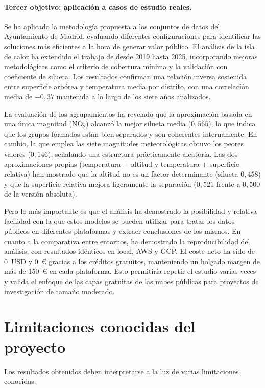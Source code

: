 \paragraph{Tercer objetivo: aplicación a casos de estudio reales.}
Se ha aplicado la metodología propuesta a los conjuntos de datos del Ayuntamiento de Madrid, evaluando diferentes configuraciones para identificar las soluciones más eficientes a la hora de generar valor público. El análisis de la isla de calor ha extendido el trabajo de \citep{Meneses2023Madrid} desde 2019 hasta 2025, incorporando mejoras metodológicas como el criterio de cobertura mínima y la validación con coeficiente de silueta. Los resultados confirman una relación inversa sostenida entre superficie arbórea y temperatura media por distrito, con una correlación media de $-0,37$ mantenida a lo largo de los siete años analizados.

La evaluación de los agrupamientos ha revelado que la aproximación basada en una única magnitud (NO$_2$) alcanzó la mejor silueta media ($0,565$), lo que indica que los grupos formados están bien separados y son coherentes internamente. En cambio, la que emplea las siete magnitudes meteorológicas obtuvo los peores valores ($0,146$), señalando una estructura prácticamente aleatoria. Las dos aproximaciones propias (temperatura + altitud y temperatura + superficie relativa) han mostrado que la altitud no es un factor determinante (silueta $0,458$) y que la superficie relativa mejora ligeramente la separación ($0,521$ frente a $0,500$ de la versión absoluta).

Pero lo más importante es que el análisis ha demostrado la posibilidad y relativa facilidad con la que estos modelos se pueden utilizar para tratar los datos públicos en diferentes plataformas y extraer conclusiones de los mismos. En cuanto a la comparativa entre entornos, ha demostrado la reproducibilidad del análisis, con resultados idénticos en local, AWS y GCP. El coste neto ha sido de 0~USD y 0~€ gracias a los créditos gratuitos, manteniendo un holgado margen de más de 150~€ en cada plataforma. Esto permitiría repetir el estudio varias veces y valida el enfoque de las capas gratuitas de las nubes públicas para proyectos de investigación de tamaño moderado.

\section{Limitaciones conocidas del proyecto}

Los resultados obtenidos deben interpretarse a la luz de varias limitaciones conocidas.

